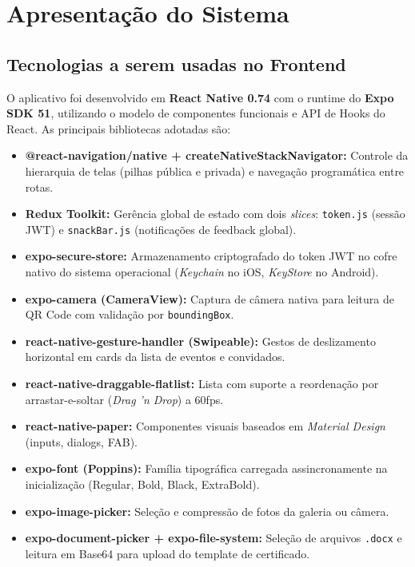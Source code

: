 \chapter{Apresentação do Sistema}

\section{Tecnologias a serem usadas no Frontend}

O aplicativo foi desenvolvido em \textbf{React Native 0.74} com o runtime do \textbf{Expo SDK 51}, utilizando o modelo de componentes funcionais e API de Hooks do React. As principais bibliotecas adotadas são:

\begin{itemize}
    \item \textbf{@react-navigation/native + createNativeStackNavigator:} Controle da hierarquia de telas (pilhas pública e privada) e navegação programática entre rotas.
    \item \textbf{Redux Toolkit:} Gerência global de estado com dois \textit{slices}: \texttt{token.js} (sessão JWT) e \texttt{snackBar.js} (notificações de feedback global).
    \item \textbf{expo-secure-store:} Armazenamento criptografado do token JWT no cofre nativo do sistema operacional (\textit{Keychain} no iOS, \textit{KeyStore} no Android).
    \item \textbf{expo-camera (CameraView):} Captura de câmera nativa para leitura de QR Code com validação por \texttt{boundingBox}.
    \item \textbf{react-native-gesture-handler (Swipeable):} Gestos de deslizamento horizontal em cards da lista de eventos e convidados.
    \item \textbf{react-native-draggable-flatlist:} Lista com suporte a reordenação por arrastar-e-soltar (\textit{Drag 'n Drop}) a 60fps.
    \item \textbf{react-native-paper:} Componentes visuais baseados em \textit{Material Design} (inputs, dialogs, FAB).
    \item \textbf{expo-font (Poppins):} Família tipográfica carregada assincronamente na inicialização (Regular, Bold, Black, ExtraBold).
    \item \textbf{expo-image-picker:} Seleção e compressão de fotos da galeria ou câmera.
    \item \textbf{expo-document-picker + expo-file-system:} Seleção de arquivos \texttt{.docx} e leitura em Base64 para upload do template de certificado.

\end{itemize}
